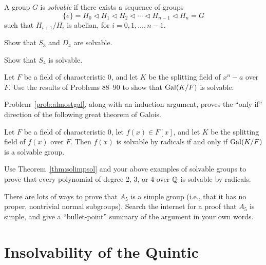 \begin{definition}
    A group $G$ is \textit{solvable} if there exists a sequence of groups
    $$\{e\}=H_0\lhd H_1 \lhd H_2\lhd \cdots \lhd H_{n-1}\lhd H_n=G$$
    such that $H_{i+1}/H_{i}$ is abelian,
    for $i=0,1,\ldots,n-1$.
\end{definition}

\begin{problem}
    Show that $S_3$ and $D_4$ are solvable.
\end{problem}



\begin{problem}
    Show that $S_4$ is solvable.
\end{problem}



\begin{problem}\label{prob:almostgal}
    Let $F$ be a field of characteristic 0, and let $K$ be the splitting field of $x^n-a$ over $F$.  Use the results of Problems 88--90 to show that $\operatorname{Gal}(K/F)$ is solvable.
\end{problem}

Problem~\ref{prob:almostgal}, along with an induction argument, proves the ``only if'' direction of the following great theorem of Galois.

\begin{theorem}[Galois]
    Let $F$ be a field of characteristic 0, let $f(x)\in F[x]$, and let $K$ be the splitting field of $f(x)$ over $F$. Then $f(x)$ is solvable by radicals if and only if $\operatorname{Gal}(K/F)$ is a solvable group.
    \label{thm:solimpsol}
\end{theorem}



\begin{problem}
    Use Theorem~\ref{thm:solimpsol} and your above examples of solvable groups to prove that every polynomial of degree 2, 3, or 4 over $\mathbb{Q}$ is solvable by radicals.
\end{problem}



\begin{problem}
    There are lots of ways to prove that $A_5$ is a simple group (i.e., that it has no proper, nontrivial normal subgroups). Search the internet for a proof that $A_5$ is simple, and give a ``bullet-point'' summary of the argument in your own words.
\end{problem}


\section{Insolvability of the Quintic}

